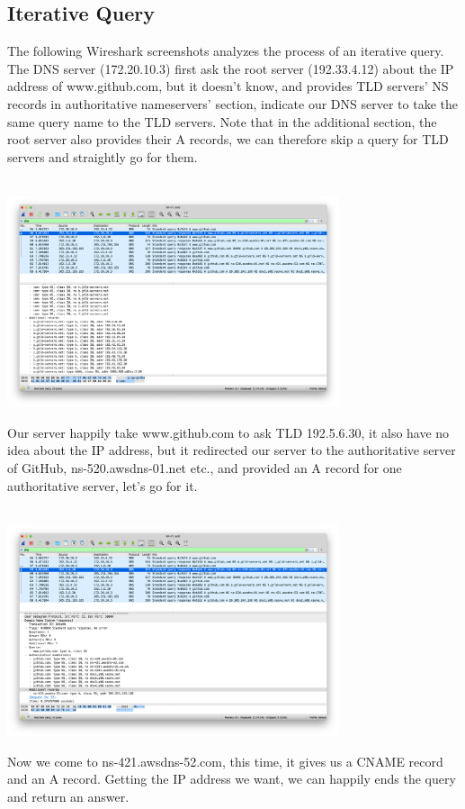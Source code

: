 \documentclass[onecolumn, oneside, ctexart]{SUSTechHomework}
\begin{document}
\subsection{Iterative Query}
The following Wireshark screenshots analyzes the process of an iterative query. The DNS server (172.20.10.3) first ask the root server (192.33.4.12) about the IP address of www.github.com, but it doesn't know, and provides TLD servers' NS records in authoritative nameservers' section, indicate our DNS server to take the same query name to the TLD servers. Note that in the additional section, the root server also provides their A records, we can therefore skip a query for TLD servers and straightly go for them.\\~\\
\centerline{\includegraphics[height=6.2cm]{fig/w1}}
\par Our server happily take www.github.com to ask TLD 192.5.6.30, it also have no idea about the IP address, but it redirected our server to the authoritative server of GitHub, ns-520.awsdns-01.net etc., and provided an A record for one authoritative server, let's go for it.\\~\\
\centerline{\includegraphics[height=6.2cm]{fig/w2}}
\par Now we come to ns-421.awsdns-52.com, this time, it gives us a CNAME record and an A record. Getting the IP address we want, we can happily ends the query and return an answer.\\~\\
\end{document}
